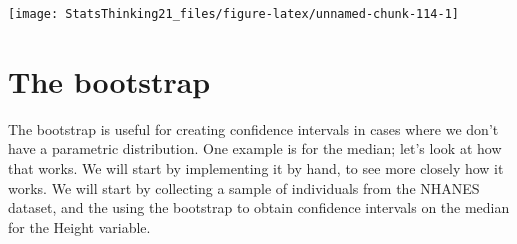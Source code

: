 \documentclass[12pt,]{book}
\newenvironment{Shaded}{\begin{snugshade}}{\end{snugshade}}
\newcommand{\CommentTok}[1]{\textcolor[rgb]{0.56,0.35,0.01}{\textit{#1}}}
\newcommand{\ControlFlowTok}[1]{\textcolor[rgb]{0.13,0.29,0.53}{\textbf{#1}}}
\newcommand{\DataTypeTok}[1]{\textcolor[rgb]{0.13,0.29,0.53}{#1}}
\newcommand{\DecValTok}[1]{\textcolor[rgb]{0.00,0.00,0.81}{#1}}
\newcommand{\FloatTok}[1]{\textcolor[rgb]{0.00,0.00,0.81}{#1}}
\newcommand{\KeywordTok}[1]{\textcolor[rgb]{0.13,0.29,0.53}{\textbf{#1}}}
\newcommand{\NormalTok}[1]{#1}
\newcommand{\OperatorTok}[1]{\textcolor[rgb]{0.81,0.36,0.00}{\textbf{#1}}}
\newcommand{\StringTok}[1]{\textcolor[rgb]{0.31,0.60,0.02}{#1}}
\begin{document}
\begin{Shaded}
\end{Shaded}

\texttt{[image: StatsThinking21\_files/figure-latex/unnamed-chunk-114-1]}

\hypertarget{the-bootstrap}{%
\section{The bootstrap}\label{the-bootstrap}}

The bootstrap is useful for creating confidence intervals in cases where we don't have a parametric distribution. One example is for the median; let's look at how that works. We will start by implementing it by hand, to see more closely how it works. We will start by collecting a sample of individuals from the NHANES dataset, and the using the bootstrap to obtain confidence intervals on the median for the Height variable.
\end{document}
